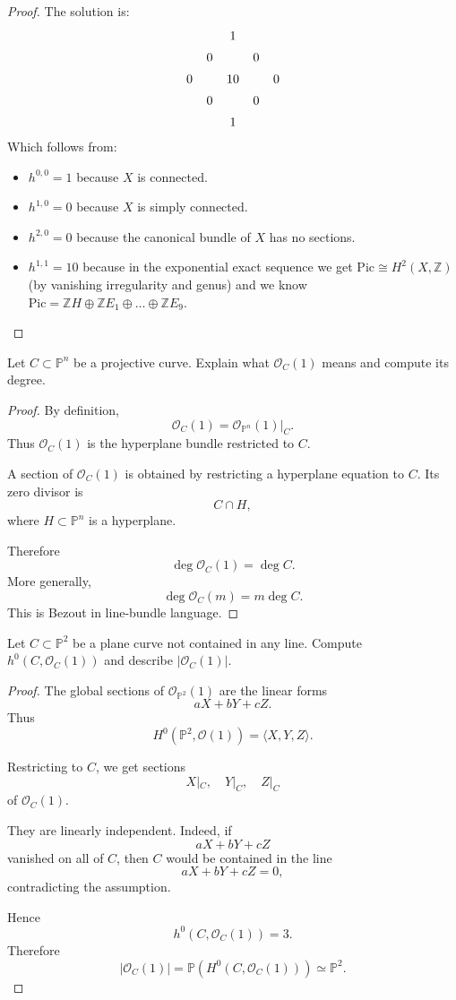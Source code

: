 \begin{proof}
The solution is:
$$
\begin{aligned}\xymatrix@C=.5em@R=.5em{
&  &   1\\
&  0&  &  0\\
0&&  10&  &  0\\
&  0&  &  0\\
&  &  1
}\end{aligned}
$$
Which follows from:
\begin{itemize}
\item $h^{0,0}=1$ because $X$ is connected.
\item $h^{1,0}=0$ because $X$ is simply
connected.
\item $h^{2,0}=0$ because the canonical
bundle of $X$ has no sections.
\item $h^{1,1}=10$ because in the exponential
exact sequence
we get $\text{Pic} \cong H^2(X,\mathbb{Z})$
(by vanishing irregularity and genus)
and we know
$\text{Pic}=\mathbb{Z}H \oplus
\mathbb{Z}E_1\oplus…\oplus \mathbb{Z}E_9$.
\end{itemize}
\end{proof}

\begin{exercise}
\label{exercise-line-bundle-degree}
Let $C\subset \mathbb P^n$ be a
projective curve. Explain what
$\mathcal O_C(1)$ means and compute its
degree.
\end{exercise}

\begin{proof}
By definition,
$$
  \mathcal O_C(1)
  =
  \mathcal O_{\mathbb P^n}(1)|_C.
$$
Thus $\mathcal O_C(1)$ is the hyperplane
bundle restricted to $C$.

A section of $\mathcal O_C(1)$ is obtained
by restricting a hyperplane equation to
$C$. Its zero divisor is
$$
  C\cap H,
$$
where $H\subset \mathbb P^n$ is a
hyperplane.

Therefore
$$
  \deg \mathcal O_C(1)=\deg C.
$$
More generally,
$$
  \deg \mathcal O_C(m)=m\deg C.
$$
This is Bezout in line-bundle language.
\end{proof}

\begin{exercise}
\label{exercise-plane-section-dimension}
Let $C\subset \mathbb P^2$ be a plane
curve not contained in any line. Compute
$h^0(C,\mathcal O_C(1))$ and describe
$|\mathcal O_C(1)|$.
\end{exercise}

\begin{proof}
The global sections of
$\mathcal O_{\mathbb P^2}(1)$ are the
linear forms
$$
  aX+bY+cZ.
$$
Thus
$$
  H^0(\mathbb P^2,\mathcal O(1))
  =
  \langle X,Y,Z\rangle.
$$

Restricting to $C$, we get sections
$$
  X|_C,\quad Y|_C,\quad Z|_C
$$
of $\mathcal O_C(1)$.

They are linearly independent. Indeed,
if
$$
  aX+bY+cZ
$$
vanished on all of $C$, then $C$ would be
contained in the line
$$
  aX+bY+cZ=0,
$$
contradicting the assumption.

Hence
$$
  h^0(C,\mathcal O_C(1))=3.
$$
Therefore
$$
  |\mathcal O_C(1)|
  =
  \mathbb P(H^0(C,\mathcal O_C(1)))
  \simeq
  \mathbb P^2.
$$
\end{proof}

